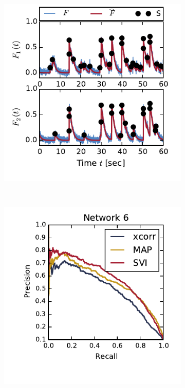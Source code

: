 \begin{figure}[t!]
  \begin{center}
    \begin{subfigure}[b]{0.32\linewidth}
      \caption{}
      \centering
      \includegraphics[width=\textwidth]{figures/ch4/figure3a.pdf} 
      \label{fig:connectomics_data}
    \end{subfigure}
    ~
    \begin{subfigure}[b]{0.32\linewidth}
      \caption{}
      \centering
      \includegraphics[width=\textwidth]{figures/ch4/figure3d.pdf} 

\end{subfigure}
\end{center}
\end{figure}
